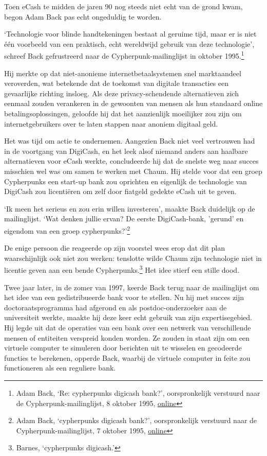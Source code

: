 \documentclass[
  a5paper,
  smalldemyvopaper,11pt,twoside,onecolumn,openright,extrafontsizes]{memoir}
\begin{document}
Toen eCash te midden de jaren 90 nog steeds niet echt van de grond kwam,
begon Adam Back pas echt ongeduldig te worden.

`Technologie voor blinde handtekeningen bestaat al geruime tijd, maar er
is niet één voorbeeld van een praktisch, echt wereldwijd gebruik van
deze technologie', schreef Back gefrustreerd naar de
Cypherpunk-mailinglijst in oktober 1995.\footnote{Adam Back, `Re:
  cypherpunks digicash bank?', oorspronkelijk verstuurd naar de
  Cypherpunk-mailinglijst, 8 oktober 1995,
  \href{https://cypherpunks.venona.com/date/1995/10/msg00734.html}{online}}

Hij merkte op dat niet-anonieme internetbetaalsystemen snel marktaandeel
veroverden, wat betekende dat de toekomst van digitale transacties een
gevaarlijke richting insloeg. Als deze privacy-schendende alternatieven
zich eenmaal zouden verankeren in de gewoonten van mensen als hun
standaard online betalingsoplossingen, geloofde hij dat het aanzienlijk
moeilijker zou zijn om internetgebruikers over te laten stappen naar
anoniem digitaal geld.

Het was tijd om actie te ondernemen. Aangezien Back niet veel vertrouwen
had in de voortgang van DigiCash, en het leek alsof niemand anders aan
haalbare alternatieven voor eCash werkte, concludeerde hij dat de
snelste weg naar succes misschien wel was om samen te werken met Chaum.
Hij stelde voor dat een groep Cypherpunks een start-up bank zou
oprichten en eigenlijk de technologie van DigiCash zou licentiëren om
zelf door fiatgeld gedekte eCash uit te geven.

`Ik meen het serieus en zou erin willen investeren', maakte Back
duidelijk op de mailinglijst. `Wat denken jullie ervan? De eerste
DigiCash-bank, 'gerund' en eigendom van een groep
cypherpunks?'\footnote{Adam Back, `cypherpunks digicash bank?',
  oorspronkelijk verstuurd naar de Cypherpunk-mailinglijst, 7 oktober
  1995,
  \href{https://cypherpunks.venona.com/date/1995/10/msg00690.html}{online}}

De enige persoon die reageerde op zijn voorstel wees erop dat dit plan
waarschijnlijk ook niet zou werken: tenslotte wilde Chaum zijn
technologie niet in licentie geven aan een bende Cypherpunks.\footnote{Barnes,
  `cypherpunks digicash.'} Het idee stierf een stille dood.

Twee jaar later, in de zomer van 1997, keerde Back terug naar de
mailinglijst om het idee van een gedistribueerde bank voor te stellen.
Nu hij met succes zijn doctoraatsprogramma had afgerond en als
postdoc-onderzoeker aan de universiteit werkte, maakte hij deze keer
echt gebruik van zijn expertisegebied. Hij legde uit dat de operaties
van een bank over een netwerk van verschillende mensen of entiteiten
verspreid konden worden. Ze zouden in staat zijn om een virtuele
computer te simuleren door berichten uit te wisselen en gecodeerde
functies te berekenen, opperde Back, waarbij de virtuele computer in
feite zou functioneren als een reguliere bank.
\end{document}
